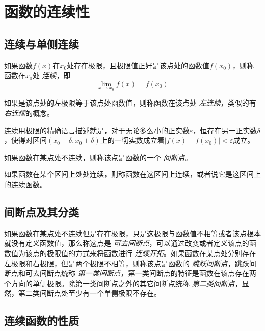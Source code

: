 
\section{函数的连续性}
\label{sec:continuousness-of-function}

\subsection{连续与单侧连续}
\label{sec:continuousness-and-single-continuousness}

\begin{definition}
  如果函数$f(x)$在$x_0$处存在极限，且极限值正好是该点处的函数值$f(x_0)$，则称函数在$x_0$处 \emph{连续}，即
  \[ \lim_{x \to x_0} f(x) = f(x_0) \]
\end{definition}

如果是该点处的左极限等于该点处函数值，则称函数在该点处 \emph{左连续}，类似的有 \emph{右连续}的概念。

连续用极限的精确语言描述就是，对于无论多么小的正实数$\varepsilon$，恒存在另一正实数$\delta$，使得对区间$(x_0-\delta, x_0+\delta)$上的一切实数成立着$|f(x)-f(x_0)|<\varepsilon$成立。

如果函数在某点处不连续，则称该点是函数的一个 \emph{间断点}。

\begin{definition}
  如果函数在某个区间上处处连续，则称函数在这区间上连续，或者说它是这区间上的连续函数。
\end{definition}


\subsection{间断点及其分类}
\label{sec:discontinuity-point-and-its-category}

如果函数在某点处不连续但是存在极限，只是这极限与函数值不相等或者该点根本就没有定义函数值，那么称这点是 \emph{可去间断点}，可以通过改变或者定义该点的函数值为该点的极限值的方式来将函数进行 \emph{连续开拓}。如果函数在某点处分别存在左极限和右极限，但是两个极限不相等，则称该点是函数的 \emph{跳跃间断点}，跳跃间断点和可去间断点统称 \emph{第一类间断点}，第一类间断点的特征是函数在该点存在两个方向的单侧极限。除第一类间断点之外的其它间断点统称 \emph{第二类间断点}，显然，第二类间断点处至少有一个单侧极限不存在。

\subsection{连续函数的性质}
\label{sec:properties-of-continuous-function}


